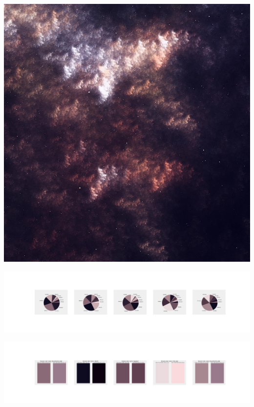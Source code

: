 \documentclass[11pt]{article}
\begin{document}
\begin{landscape}
    \begin{center}
    \includegraphics[width=\textwidth]{./nbimg/file (109).jpg}
    \end{center}

    \begin{center}
    \includegraphics[width=250mm]{./nbimg/pie-11.jpg}
    \end{center}

    \begin{center}
    \includegraphics[width=250mm]{./nbimg/peak-11.jpg}
    \end{center}
    


\end{landscape}
\end{document}
